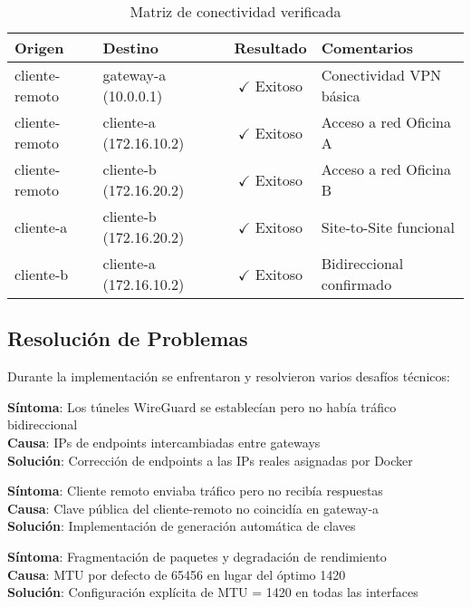 \begin{table}[H]
\centering
\caption{Matriz de conectividad verificada}
\label{tab:optimizaciones}
\begin{tabular}{|l|l|c|l|}
\hline
\textbf{Origen} & \textbf{Destino} & \textbf{Resultado} & \textbf{Comentarios} \\
\hline
cliente-remoto & gateway-a (10.0.0.1) & $\checkmark$ Exitoso & Conectividad VPN básica \\
\hline
cliente-remoto & cliente-a (172.16.10.2) & $\checkmark$ Exitoso & Acceso a red Oficina A \\
\hline
cliente-remoto & cliente-b (172.16.20.2) & $\checkmark$ Exitoso & Acceso a red Oficina B \\
\hline
cliente-a & cliente-b (172.16.20.2) & $\checkmark$ Exitoso & Site-to-Site funcional \\
\hline
cliente-b & cliente-a (172.16.10.2) & $\checkmark$ Exitoso & Bidireccional confirmado \\
\hline
\end{tabular}
\end{table}

\subsection{Resolución de Problemas}

Durante la implementación se enfrentaron y resolvieron varios desafíos técnicos:

\begin{alerta}
\textbf{Síntoma}: Los túneles WireGuard se establecían pero no había tráfico bidireccional\\
\textbf{Causa}: IPs de endpoints intercambiadas entre gateways\\
\textbf{Solución}: Corrección de endpoints a las IPs reales asignadas por Docker
\end{alerta}

\begin{alerta}
\textbf{Síntoma}: Cliente remoto enviaba tráfico pero no recibía respuestas\\
\textbf{Causa}: Clave pública del cliente-remoto no coincidía en gateway-a\\
\textbf{Solución}: Implementación de generación automática de claves
\end{alerta}

\begin{alerta}
\textbf{Síntoma}: Fragmentación de paquetes y degradación de rendimiento\\
\textbf{Causa}: MTU por defecto de 65456 en lugar del óptimo 1420\\
\textbf{Solución}: Configuración explícita de MTU = 1420 en todas las interfaces
\end{alerta}

